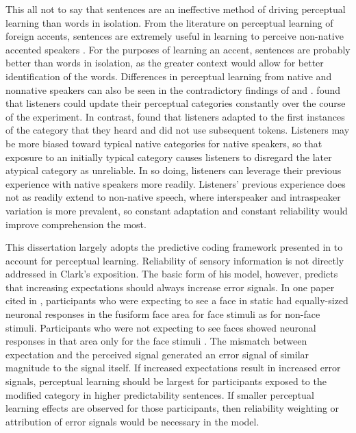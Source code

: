 This all not to say that sentences are an ineffective method of driving perceptual learning than words in isolation.
From the literature on perceptual learning of foreign accents, sentences are extremely useful in learning to perceive non-native accented speakers \citep{Bradlow2008}.
For the purposes of learning an accent, sentences are probably better than words in isolation, as the greater context would allow for better identification of the words.
Differences in perceptual learning from native and nonnative speakers can also be seen in the contradictory findings of \citet{Sumner2011} and \citet{Kraljic2008}.
\citet{Sumner2011} found that listeners could update their perceptual categories constantly over the course of the experiment.
In contrast, \citet{Kraljic2008} found that listeners adapted to the first instances of the category that they heard and did not use subsequent tokens.
Listeners may be more biased toward typical native categories for native speakers, so that exposure to an initially typical category causes listeners to disregard the later atypical category as unreliable.
In so doing, listeners can leverage their previous experience with native speakers more readily.
Listeners' previous experience does not as readily extend to non-native speech, where interspeaker and intraspeaker variation is more prevalent, so constant adaptation and constant reliability would improve comprehension the most.

This dissertation largely adopts the predictive coding framework presented in \citet{Clark2013} to account for perceptual learning.
Reliability of sensory information is not directly addressed in Clark's exposition.
The basic form of his model, however, predicts that increasing expectations should always increase error signals.
In one paper cited in \citet{Clark2013}, participants who were expecting to see a face in static had equally-sized neuronal responses in the fusiform face area for face stimuli as for non-face stimuli.  
Participants who were not expecting to see faces showed neuronal responses in that area only for the face stimuli \citep{Egner2010}.
The mismatch between expectation and the perceived signal generated an error signal of similar magnitude to the signal itself.
If increased expectations result in increased error signals, perceptual learning should be largest for participants exposed to the modified category in higher predictability sentences.
If smaller perceptual learning effects are observed for those participants, then reliability weighting or attribution of error signals would be necessary in the model.

